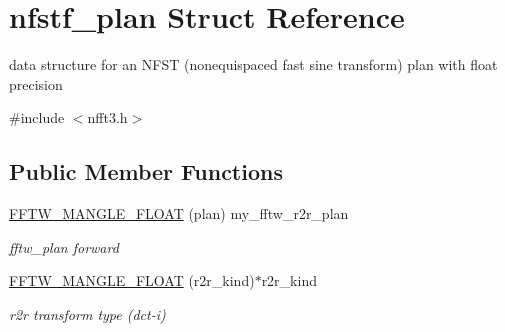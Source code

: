 \hypertarget{structnfstf__plan}{\section{nfstf\-\_\-plan Struct Reference}
\label{structnfstf__plan}
}


data structure for an N\-F\-S\-T (nonequispaced fast sine transform) plan with float precision  




{\ttfamily \#include $<$nfft3.\-h$>$}

\subsection*{Public Member Functions}
\begin{DoxyCompactItemize}
\item 
\hypertarget{structnfstf__plan_ad4f44281f0c352fc630442cb40597983}{\hyperlink{structnfstf__plan_ad4f44281f0c352fc630442cb40597983}{F\-F\-T\-W\-\_\-\-M\-A\-N\-G\-L\-E\-\_\-\-F\-L\-O\-A\-T} (plan) my\-\_\-fftw\-\_\-r2r\-\_\-plan}\label{structnfstf__plan_ad4f44281f0c352fc630442cb40597983}

\begin{DoxyCompactList}\small\item\em fftw\-\_\-plan forward \end{DoxyCompactList}\item 
\hypertarget{structnfstf__plan_a013fbbcfb64ef4d8f0cc7345e584fa92}{\hyperlink{structnfstf__plan_a013fbbcfb64ef4d8f0cc7345e584fa92}{F\-F\-T\-W\-\_\-\-M\-A\-N\-G\-L\-E\-\_\-\-F\-L\-O\-A\-T} (r2r\-\_\-kind)$\ast$r2r\-\_\-kind}\label{structnfstf__plan_a013fbbcfb64ef4d8f0cc7345e584fa92}

\begin{DoxyCompactList}\small\item\em r2r transform type (dct-\/i) \end{DoxyCompactList}\end{DoxyCompactItemize}
